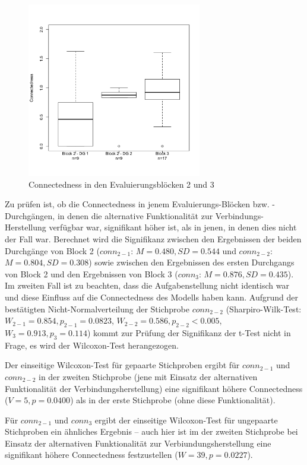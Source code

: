 \begin{figure}[htbp]
	\centering
		\includegraphics[height=3in]{img/Evaluierung/connectednessOverview.png}
	\caption{Connectedness in den Evaluierungsblöcken 2 und 3}
	\label{fig:img_Evaluierung_connectednessOverview}
\end{figure} 

Zu prüfen ist, ob die Connectedness in jenem Evaluierungs-Blöcken bzw. -Durchgängen, in denen die alternative Funktionalität zur Verbindungs-Herstellung verfügbar war, signifikant höher ist, als in jenen, in denen dies nicht der Fall war. Berechnet wird die Signifikanz zwischen den Ergebnissen der beiden Durchgänge von Block 2 ($conn_{2-1}$: $M=0.480, SD=0.544$ und $conn_{2-2}$: $M=0.804, SD=0.308$) sowie zwischen den Ergebnissen des ersten Durchgangs von Block 2 und den Ergebnissen von Block 3 ($conn_{3}$: $M=0.876, SD=0.435$). Im zweiten Fall ist zu beachten, dass die Aufgabenstellung nicht identisch war und diese Einfluss auf die Connectedness des Modells haben kann. Aufgrund der bestätigten Nicht-Normalverteilung der Stichprobe $conn_{2-2}$ (Sharpiro-Wilk-Test: $W_{2-1}=0.854, p_{2-1}=0.0823$, $W_{2-2}=0.586, p_{2-2}<0.005$, $W_{3}=0.913, p_{3}=0.114$) kommt zur Prüfung der Signifikanz der t-Test nicht in Frage, es wird der Wilcoxon-Test herangezogen.

Der einseitige Wilcoxon-Test für gepaarte Stichproben ergibt für $conn_{2-1}$ und $conn_{2-2}$ in der zweiten Stichprobe (jene mit Einsatz der alternativen Funktionalität der Verbindungsherstellung) eine signifikant höhere Connectedness ($V=5, p=0.0400$) als in der erste Stichprobe (ohne diese Funktionalität). 

Für $conn_{2-1}$ und $conn_{3}$ ergibt der einseitige Wilcoxon-Test für ungepaarte Stichproben ein ähnliches Ergebnis -- auch hier ist im der zweiten Stichprobe bei Einsatz der alternativen Funktionalität zur Verbiundungsherstellung eine signifikant höhere Connectedness festzustellen ($W=39, p=0.0227$).

